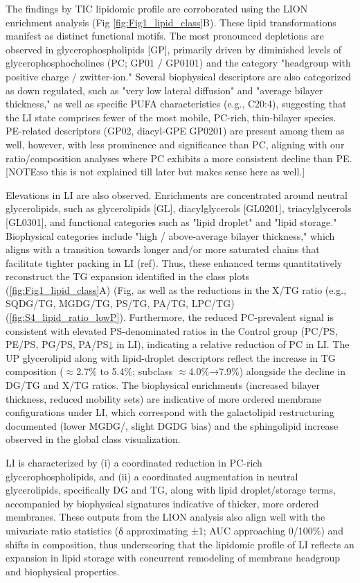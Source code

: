 \documentclass[10pt,letterpaper]{article}
\begin{document}
\begin{itemize}
The findings by TIC lipidomic profile are corroborated using the LION enrichment analysis (Fig \ref{fig:Fig1_lipid_class}B). These lipid transformations manifest as distinct functional motifs. The most pronounced depletions are observed in glycerophospholipids [GP], primarily driven by diminished levels of glycerophosphocholines (PC; GP01 / GP0101) and the category "headgroup with positive charge / zwitter-ion." Several biophysical descriptors are also categorized as down regulated, such as "very low lateral diffusion" and "average bilayer thickness," as well as specific PUFA characteristics (e.g., C20:4), suggesting that the LI state comprises fewer of the most mobile, PC-rich, thin-bilayer species. PE-related descriptors (GP02, diacyl-GPE GP0201) are present among them as well, however, with less prominence and significance than PC, aligning with our ratio/composition analyses where PC exhibits a more consistent decline than PE. [NOTE:so this is not explained till later but makes sense here as well.]

Elevations in LI are also observed. Enrichments are concentrated around neutral glycerolipids, such as glycerolipids [GL], diacylglycerols [GL0201], triacylglycerols [GL0301], and functional categories such as "lipid droplet" and "lipid storage." Biophysical categories include "high / above-average bilayer thickness," which aligns with a transition towards longer and/or more saturated chains that facilitate tighter packing in LI (ref). Thus, these enhanced terms quantitatively reconstruct the TG expansion identified in the class plots (\ref{fig:Fig1_lipid_class}A) (Fig, as well as the reductions in the X/TG ratio (e.g., SQDG/TG, MGDG/TG, PS/TG, PA/TG, LPC/TG)(\ref{fig:S4_lipid_ratio_lowP}). Furthermore, the reduced PC-prevalent signal is consistent with elevated PS-denominated ratios in the Control group (PC/PS, PE/PS, PG/PS, PA/PS↓ in LI), indicating a relative reduction of PC in LI. The UP glycerolipid along with lipid-droplet descriptors reflect the increase in TG composition ($\approx$2.7\% to 5.4\%; subclass $\approx$4.0\%→7.9\%) alongside the decline in DG/TG and X/TG ratios. The biophysical enrichments (increased bilayer thickness, reduced mobility sets) are indicative of more ordered membrane configurations under LI, which correspond with the galactolipid restructuring documented (lower MGDG/, slight DGDG bias) and the sphingolipid increase observed in the global class visualization. 

LI is characterized by (i) a coordinated reduction in PC-rich glycerophospholipids, and (ii) a coordinated augmentation in neutral glycerolipids, specifically DG and TG, along with lipid droplet/storage terms, accompanied by biophysical signatures indicative of thicker, more ordered membranes. These outputs from the LION analysis also align well with the univariate ratio statistics (δ approximating ±1; AUC approaching 0/100\%) and shifts in composition, thus underscoring that the lipidomic profile of LI reflects an expansion in lipid storage with concurrent remodeling of membrane headgroup and biophysical properties.


\end{itemize}
\end{document}
